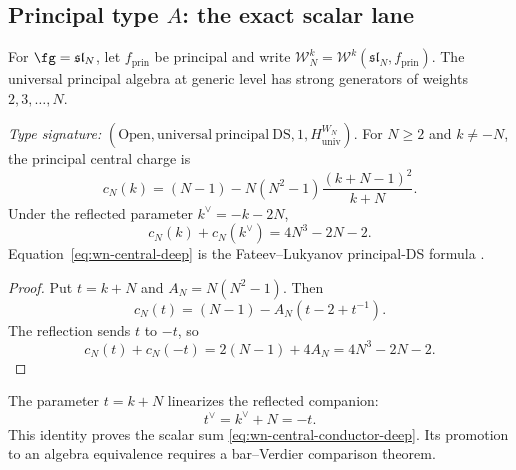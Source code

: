\subsection{Principal type \(A\): the exact scalar lane}
\label{sec:principal-wn-exact}

For \(\fg=\mathfrak{sl}_N\), let \(f_{\mathrm{prin}}\) be principal
and write \(\mathcal W_N^k=\mathcal W^k(\mathfrak{sl}_N,f_{\mathrm{prin}})\).
The universal principal algebra at generic level has strong
generators of weights \(2,3,\ldots,N\).

\begin{theorem}
\label{thm:wn-central-companion-deep}
\ClaimStatusProvedHere
\emph{Type signature:}
\((\mathrm{Open},\mathrm{universal\ principal\ DS},1,
H_{\mathrm{univ}}^{W_N})\).
For \(N\ge2\) and \(k\ne-N\), the principal central charge is
\begin{equation}
\label{eq:wn-central-deep}
c_N(k)
=(N-1)-N(N^2-1)\frac{(k+N-1)^2}{k+N}.
\end{equation}
Under the reflected parameter \(k^\vee=-k-2N\),
\begin{equation}
\label{eq:wn-central-conductor-deep}
c_N(k)+c_N(k^\vee)
=4N^3-2N-2.
\end{equation}
Equation~\eqref{eq:wn-central-deep} is the Fateev--Lukyanov
principal-DS formula \cite[Equation~\textup{(}7\textup{)}]{FateevLukyanov88}.
\end{theorem}

\begin{proof}
Put \(t=k+N\) and \(A_N=N(N^2-1)\).  Then
\[
c_N(t)=(N-1)-A_N\left(t-2+t^{-1}\right).
\]
The reflection sends \(t\) to \(-t\), so
\[
c_N(t)+c_N(-t)
=2(N-1)+4A_N
=4N^3-2N-2.
\]
\end{proof}

\begin{computation}
\label{comp:ff-thooft-involution}
\ClaimStatusComputed
The parameter \(t=k+N\) linearizes the reflected companion:
\[
t^\vee=k^\vee+N=-t.
\]
This identity proves the scalar sum
\eqref{eq:wn-central-conductor-deep}.  Its promotion to an algebra
equivalence requires a bar--Verdier comparison theorem.
\end{computation}

